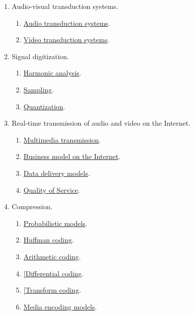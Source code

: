 \begin{enumerate}
\item Audio-visual transduction systems.
  \begin{enumerate}
  \item \href{https://cdn.rawgit.com/vicente-gonzalez-ruiz/audio_transduction_systems/master/index.html}{Audio transduction systems}.
  \item \href{https://cdn.rawgit.com/vicente-gonzalez-ruiz/video_transduction_systems/master/index.html}{Video transduction systems}.
  \end{enumerate}
\item Signal digitization.
  \begin{enumerate}               
  \item \href{https://cdn.rawgit.com/vicente-gonzalez-ruiz/harmonic_analysis/master/index.html}{Harmonic analysis}.
  \item \href{https://cdn.rawgit.com/vicente-gonzalez-ruiz/sampling/master/index.html}{Sampling}.
  \item \href{https://cdn.rawgit.com/vicente-gonzalez-ruiz/quantization/master/index.html}{Quantization}.
  \end{enumerate}
  
\item Real-time transmission of audio and video on the Internet.
  \begin{enumerate}
  \item \href{(https://cdn.rawgit.com/vicente-gonzalez-ruiz/multimedia_transmission/master/index.html}{Multimedia transmission}.
  \item \href{https://cdn.rawgit.com/vicente-gonzalez-ruiz/Intenet_business_model/master/index.html}{Business model on the Internet}.
  \item \href{https://cdn.rawgit.com/vicente-gonzalez-ruiz/data_delivery_models/master/index.html}{Data delivery models}.
  \item \href{https://cdn.rawgit.com/vicente-gonzalez-ruiz/quality_of_service/master/index.html}{Quality of Service}.
  \end{enumerate}
  
\item Compression.
  \begin{enumerate}
  \item \href{https://cdn.rawgit.com/vicente-gonzalez-ruiz/Probabilistic_Models/master/index.html}{Probabilistic models}.
  \item \href{https://rawgit.com/vicente-gonzalez-ruiz/Huffman_Coding/master/index.html}{Huffman coding}.
  \item \href{https://cdn.rawgit.com/vicente-gonzalez-ruiz/Arithmetic_Coding/master/index.html}{Arithmetic coding}.
  \item \href{https://cdn.rawgit.com/vicente-gonzalez-ruiz/differential_coding/master/index.html}{[Differential coding}.
  \item \href{https://cdn.rawgit.com/vicente-gonzalez-ruiz/transform_coding/master/index.html}{[Transform coding}.
  \item \href{https://cdn.rawgit.com/vicente-gonzalez-ruiz/media_encoding_models/master/index.html}{Media encoding models}.
  \end{enumerate}

\end{enumerate}

%

